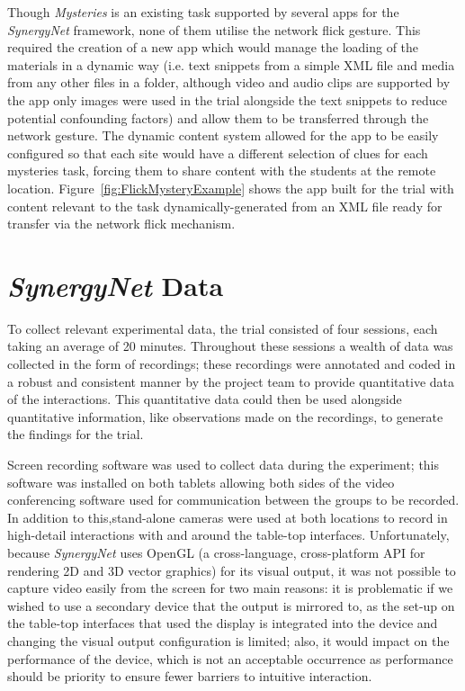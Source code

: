 \documentclass[a4paper,11pt]{article}
\begin{document}
Though {\emph{Mysteries}} is an existing task supported by several apps for the {\emph{SynergyNet}} framework, none of them utilise the network flick gesture.
This required the creation of a new app which would manage the loading of the materials in a dynamic way (i.e. text snippets from a simple XML file and media from any other files in a folder, although video and audio clips are supported by the app only images were used in the trial alongside the text snippets to reduce potential confounding factors) and allow them to be transferred through the network gesture.
The dynamic content system allowed for the app to be easily configured so that each site would have a different selection of clues for each mysteries task, forcing them to share content with the students at the remote location.
Figure~\ref{fig:FlickMysteryExample} shows the app built for the trial with content relevant to the task dynamically-generated from an XML file ready for transfer via the network flick mechanism.


\section{{\emph{SynergyNet}} Data} 

To collect relevant experimental data, the trial consisted of four sessions, each taking an average of 20 minutes.
Throughout these sessions a wealth of data was collected in the form of recordings; these recordings were annotated and coded in a robust and consistent manner by the project team to provide quantitative data of the interactions.
This quantitative data could then be used alongside quantitative information, like observations made on the recordings, to generate the findings for the trial.
 

Screen recording software was used to collect data during the experiment; this software was installed on both tablets allowing both sides of the video conferencing software used for communication between the groups to be recorded.
In addition to this,stand-alone cameras were used at both locations to record in high-detail interactions with and around the table-top interfaces.
Unfortunately, because {\emph{SynergyNet}} uses OpenGL (a cross-language, cross-platform API for rendering 2D and 3D vector graphics) for its visual output, it was not possible to capture video easily from the screen for two main reasons: it is problematic if we wished to use a secondary device that the output is mirrored to, as the set-up on the table-top interfaces that used the display is integrated into the device and changing the visual output configuration is limited; also, it would impact on the performance of the device, which is not an acceptable occurrence as performance should be priority to ensure fewer barriers to intuitive interaction.
\end{document}
